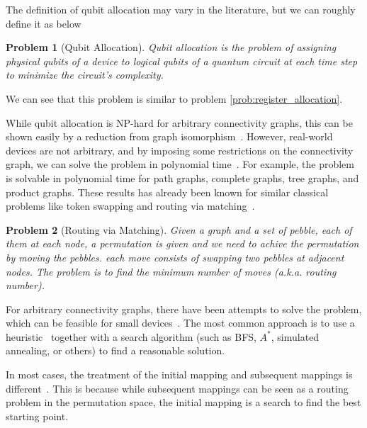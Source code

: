 \documentclass{report}
\newtheorem{problem}{Problem}
\begin{document}


The definition of qubit allocation may vary in the literature, but we can roughly define it as below

\begin{problem}[Qubit Allocation]
  Qubit allocation is the problem of assigning physical qubits of a device to logical qubits of a quantum circuit at each time step to minimize the circuit's complexity.
\end{problem}

We can see that this problem is similar to problem \ref{prob:register_allocation}.

While qubit allocation is NP-hard for arbitrary connectivity graphs, this can be shown easily by a reduction from graph isomorphism~\cite{siraichi2018}. However, real-world devices are not arbitrary, and by imposing some restrictions on the connectivity graph, we can solve the problem in polynomial time~\cite{childs}. For example, the problem is solvable in polynomial time for path graphs, complete graphs, tree graphs, and product graphs. These results has already been known for similar classical problems like token swapping and routing via matching~\cite{banerjee2017}.

\begin{problem}[Routing via Matching]
  Given a graph and a set of pebble, each of them at each node, a permutation is given and we need to achive the permutation by moving the pebbles. each move consists of swapping two pebbles at adjacent nodes. The problem is to find the minimum number of moves (a.k.a. routing number).
\end{problem}

For arbitrary connectivity graphs, there have been attempts to solve the problem, which can be feasible for small devices~\cite{siraichi2018}. The most common approach is to use a heuristic~\cite{zhang2021, itoko2019, cowtan2019} together with a search algorithm (such as BFS, $A^*$\cite{zulehner2018}, simulated annealing\cite{zhou2020}, or others\cite{li2019}) to find a reasonable solution.

In most cases, the treatment of the initial mapping and subsequent mappings is different~\cite{zhou2020, li2019}. This is because while subsequent mappings can be seen as a routing problem in the permutation space, the initial mapping is a search to find the best starting point.
\end{document}
